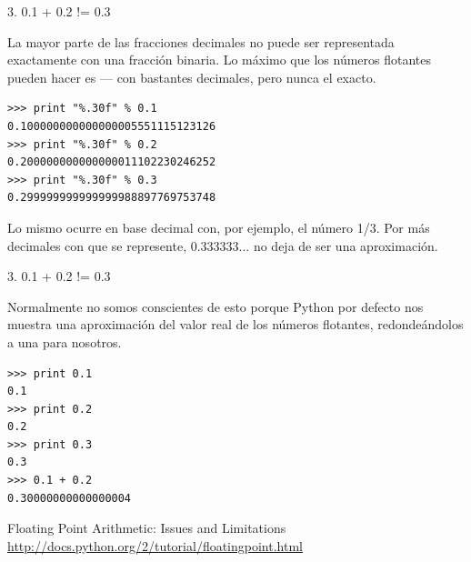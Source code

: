 \documentclass[14pt]{beamer}
\begin{document}
\begin{frame}[fragile]{3. 0.1 + 0.2 != 0.3}
  \footnotesize
  \begin{center}
    La mayor parte de las fracciones decimales no puede ser
    representada exactamente con una fracción binaria. Lo máximo que
    los números flotantes pueden hacer es  --- con bastantes decimales, pero nunca el exacto.
  \end{center}

  \begin{exampleblock}{}
    \small
    \begin{lstlisting}
>>> print "%.30f" % 0.1
0.100000000000000005551115123126
>>> print "%.30f" % 0.2
0.200000000000000011102230246252
>>> print "%.30f" % 0.3
0.299999999999999988897769753748
    \end{lstlisting}
  \end{exampleblock}

  \footnotesize
  \begin{center}
    Lo mismo ocurre en base decimal con, por ejemplo, el número
    1/3. Por más decimales con que se represente, 0.333333... no deja
    de ser una aproximación.
  \end{center}
\end{frame}

\begin{frame}[fragile]{3. 0.1 + 0.2 != 0.3}
  \small
  \begin{center}
    Normalmente no somos conscientes de esto porque Python por defecto
    nos muestra una aproximación del valor real de los números
    flotantes, redondeándolos a una  para nosotros.
  \end{center}

  \begin{exampleblock}{}
    \small
    \begin{lstlisting}
>>> print 0.1
0.1
>>> print 0.2
0.2
>>> print 0.3
0.3
>>> 0.1 + 0.2
0.30000000000000004
    \end{lstlisting}
  \end{exampleblock}

  \small
  \begin{block}{Floating Point Arithmetic: Issues and Limitations}
    \centering \url{http://docs.python.org/2/tutorial/floatingpoint.html}
  \end{block}
\end{frame}
\end{document}
